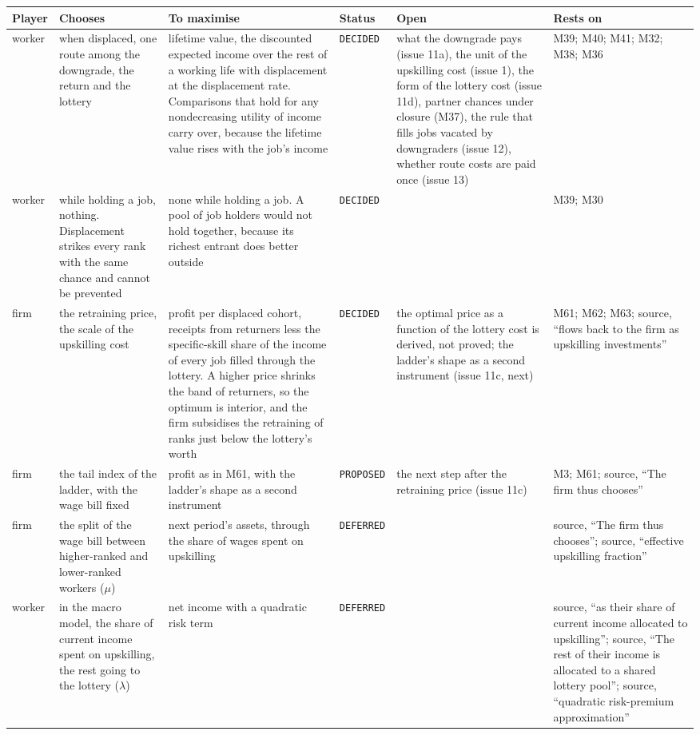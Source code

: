 \documentclass[10pt]{article}
\begin{document}
\begin{longtable}{>{\raggedright\arraybackslash}p{2.4cm} >{\raggedright\arraybackslash}p{5.0cm} >{\raggedright\arraybackslash}p{5.0cm} >{\raggedright\arraybackslash}p{2.0cm} >{\raggedright\arraybackslash}p{5.0cm} >{\raggedright\arraybackslash}p{4.4cm}}
\toprule Player & Chooses & To maximise & Status & Open & Rests on \\ \midrule \endhead
worker & when displaced, one route among the downgrade, the return and the lottery & lifetime value, the discounted expected income over the rest of a working life with displacement at the displacement rate. Comparisons that hold for any nondecreasing utility of income carry over, because the lifetime value rises with the job's income & \texttt{DECIDED} & what the downgrade pays (issue 11a), the unit of the upskilling cost (issue 1), the form of the lottery cost (issue 11d), partner chances under closure (M37), the rule that fills jobs vacated by downgraders (issue 12), whether route costs are paid once (issue 13) & M39; M40; M41; M32; M38; M36 \\ \midrule
worker & while holding a job, nothing. Displacement strikes every rank with the same chance and cannot be prevented & none while holding a job. A pool of job holders would not hold together, because its richest entrant does better outside & \texttt{DECIDED} &  & M39; M30 \\ \midrule
firm & the retraining price, the scale of the upskilling cost & profit per displaced cohort, receipts from returners less the specific-skill share of the income of every job filled through the lottery. A higher price shrinks the band of returners, so the optimum is interior, and the firm subsidises the retraining of ranks just below the lottery's worth & \texttt{DECIDED} & the optimal price as a function of the lottery cost is derived, not proved; the ladder's shape as a second instrument (issue 11c, next) & M61; M62; M63; source, ``flows back to the firm as upskilling investments'' \\ \midrule
firm & the tail index of the ladder, with the wage bill fixed & profit as in M61, with the ladder's shape as a second instrument & \texttt{PROPOSED} & the next step after the retraining price (issue 11c) & M3; M61; source, ``The firm thus chooses'' \\ \midrule
firm & the split of the wage bill between higher-ranked and lower-ranked workers ($\mu$) & next period's assets, through the share of wages spent on upskilling & \texttt{DEFERRED} &  & source, ``The firm thus chooses''; source, ``effective upskilling fraction'' \\ \midrule
worker & in the macro model, the share of current income spent on upskilling, the rest going to the lottery ($\lambda$) & net income with a quadratic risk term & \texttt{DEFERRED} &  & source, ``as their share of current income allocated to upskilling''; source, ``The rest of their income is allocated to a shared lottery pool''; source, ``quadratic risk-premium approximation'' \\ \midrule
\end{longtable}
\end{document}
